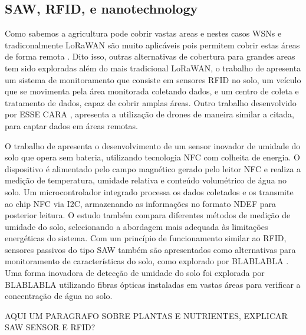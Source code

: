 \subsection{SAW, RFID, e nanotechnology}
Como sabemos a agricultura pode cobrir vastas areas e nestes casos WSNs e tradiconalmente LoRaWAN são muito aplicáveis pois permitem cobrir estas áreas de forma remota \textcite{deng_2020_novel}. Dito isso, outras alternativas de cobertura para grandes areas tem sido exploradas além do mais tradicional LoRaWAN, o trabalho de \textcite{deng_2020_novel} apresenta um sistema de monitoramento que consiste em sensores RFID no solo, um veículo que se movimenta pela área monitorada coletando dados, e um centro de coleta e tratamento de dados, capaz de cobrir amplas áreas. Outro trabalho desenvolvido por ESSE CARA \textcite{akhileshnagpure_2022_water}, apresenta a utilização de drones de maneira similar a citada, para captar dados em áreas remotas.

O trabalho de \textcite{boada_2018_batteryless} apresenta o desenvolvimento de um sensor inovador de umidade do solo que opera sem bateria, utilizando tecnologia NFC com colheita de energia. O dispositivo é alimentado pelo campo magnético gerado pelo leitor NFC e realiza a medição de temperatura, umidade relativa e conteúdo volumétrico de água no solo. Um microcontrolador integrado processa os dados coletados e os transmite ao chip NFC via I2C, armazenando as informações no formato NDEF para posterior leitura. O estudo também compara diferentes métodos de medição de umidade do solo, selecionando a abordagem mais adequada às limitações energéticas do sistema. Com um princípio de funcionamento similar ao RFID, sensores passivos do tipo SAW também são apresentados como alternativas para monitoramento de características do solo, como explorado por BLABLABLA \textcite{akhileshnagpure_2022_water}. Uma forma inovadora de detecção de umidade do solo foi explorada por BLABLABLA \textcite{akhileshnagpure_2022_water} utilizando fibras ópticas instaladas em vastas áreas para verificar a concentração de água no solo.

AQUI UM PARAGRAFO SOBRE PLANTAS E NUTRIENTES, EXPLICAR SAW SENSOR E RFID?

